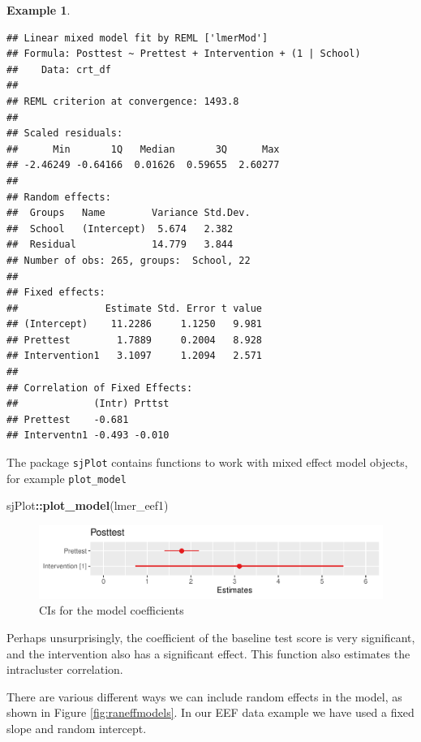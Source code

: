 \documentclass[
  openany]{book}
\newenvironment{Shaded}{\begin{snugshade}}{\end{snugshade}}
\newcommand{\FunctionTok}[1]{\textcolor[rgb]{0.13,0.29,0.53}{\textbf{#1}}}
\newcommand{\NormalTok}[1]{#1}
\newcommand{\SpecialCharTok}[1]{\textcolor[rgb]{0.81,0.36,0.00}{\textbf{#1}}}
\theoremstyle{definition}
\theoremstyle{definition}
\newtheorem{example}{Example}[chapter]
\theoremstyle{definition}
\theoremstyle{definition}
\theoremstyle{remark}
\begin{document}
\begin{example}
\begin{verbatim}
## Linear mixed model fit by REML ['lmerMod']
## Formula: Posttest ~ Prettest + Intervention + (1 | School)
##    Data: crt_df
## 
## REML criterion at convergence: 1493.8
## 
## Scaled residuals: 
##      Min       1Q   Median       3Q      Max 
## -2.46249 -0.64166  0.01626  0.59655  2.60277 
## 
## Random effects:
##  Groups   Name        Variance Std.Dev.
##  School   (Intercept)  5.674   2.382   
##  Residual             14.779   3.844   
## Number of obs: 265, groups:  School, 22
## 
## Fixed effects:
##               Estimate Std. Error t value
## (Intercept)    11.2286     1.1250   9.981
## Prettest        1.7889     0.2004   8.928
## Intervention1   3.1097     1.2094   2.571
## 
## Correlation of Fixed Effects:
##             (Intr) Prttst
## Prettest    -0.681       
## Interventn1 -0.493 -0.010
\end{verbatim}

The package \texttt{sjPlot} contains functions to work with mixed effect model objects, for example \texttt{plot\_model}

\begin{Shaded}
\begin{Highlighting}[]
\NormalTok{sjPlot}\SpecialCharTok{::}\FunctionTok{plot\_model}\NormalTok{(lmer\_eef1)}
\end{Highlighting}
\end{Shaded}

\begin{figure}
\centering
\includegraphics{CT4H_notes_files/figure-latex/lmerplot1-1.pdf}
\caption{\label{fig:lmerplot1}CIs for the model coefficients}
\end{figure}

Perhaps unsurprisingly, the coefficient of the baseline test score is very significant, and the intervention also has a significant effect. This function also estimates the intracluster correlation.
\end{example}

There are various different ways we can include random effects in the model, as shown in Figure \ref{fig:raneffmodels}. In our EEF data example we have used a fixed slope and random intercept.
\end{document}
